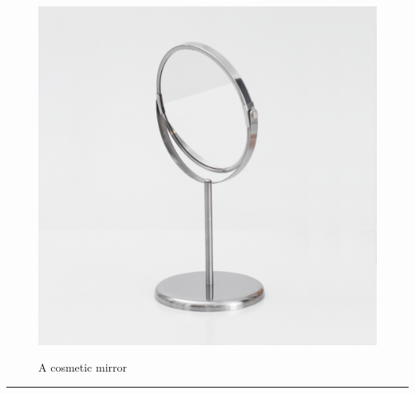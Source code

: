 \documentclass{article}
\begin{document}
    \begin{figure}[H]
        \centering
        \begin{minipage}{0.25\textwidth}
            \centering
            \includegraphics[width=\textwidth]{../SurvivalItemImages/mirror}
        \end{minipage}\hfill
        \begin{minipage}{0.7\textwidth}
            \centering
            \Large A cosmetic mirror
        \end{minipage}
    \end{figure}
    \vspace{-0.8em}
    \noindent\rule{\textwidth}{0.4pt}
            
\end{document}
